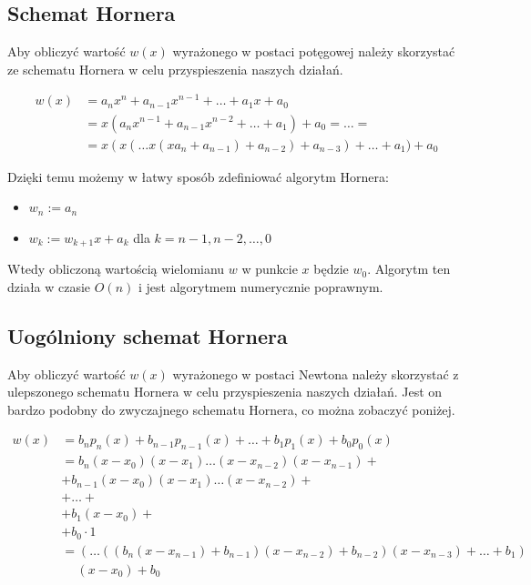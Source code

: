 \documentclass[a4paper,11pt]{article}
\begin{document}
\subsection{Schemat Hornera}
Aby obliczyć wartość $w(x)$ wyrażonego w postaci potęgowej należy skorzystać ze schematu Hornera w celu przyspieszenia naszych działań.

\[
\begin{split}
w(x) & = a_{n}x^{n}+a_{n-1}x^{n-1}+\ldots+a_1x+a_0 \\
	 & = x(a_{n}x^{n-1}+a_{n-1}x^{n-2}+\ldots+a_1) + a_0 = \ldots = \\
	 & = x(x(\ldots x(xa_n + a_{n-1})+a_{n-2})+a_{n-3})+\ldots+a_1)+a_0
\end{split}
\]

\noindent Dzięki temu możemy w łatwy sposób zdefiniować algorytm Hornera:
\begin{itemize}
\item $w_n := a_n$
\item $w_k := w_{k+1}x+a_k$ dla $k=n-1, n-2, \ldots, 0$
\end{itemize}
Wtedy obliczoną wartością wielomianu $w$ w punkcie $x$ będzie $w_0$.
\newline Algorytm ten działa w czasie $O(n)$ i jest algorytmem numerycznie poprawnym.

\subsection{Uogólniony schemat Hornera}
Aby obliczyć wartość $w(x)$ wyrażonego w postaci Newtona należy skorzystać z ulepszonego schematu Hornera w celu przyspieszenia naszych działań. Jest on bardzo podobny do zwyczajnego schematu Hornera, co można zobaczyć poniżej.

\[
\begin{split}
w(x) & = b_{n}p_{n}(x)+b_{n-1}p_{n-1}(x)+\ldots+ b_1p_1(x)+b_0p_0(x)\\
	 & = b_{n}(x-x_0)(x-x_1)\ldots(x-x_{n-2})(x-x_{n-1}) + \\
	 & + b_{n-1}(x-x_0)(x-x_1)\ldots(x-x_{n-2}) +\\
	 & + \ldots +\\
	 & + b_1(x-x_0) +\\
	 & + b_0 \cdot 1 \\
 	 & = (\ldots((b_n(x-x_{n-1})+b_{n-1})(x-x_{n-2})+b_{n-2})(x-x_{n-3})+\ldots+b_1)\\
	 & \quad \ (x-x_0)+b_0
\end{split}
\]
\end{document}
